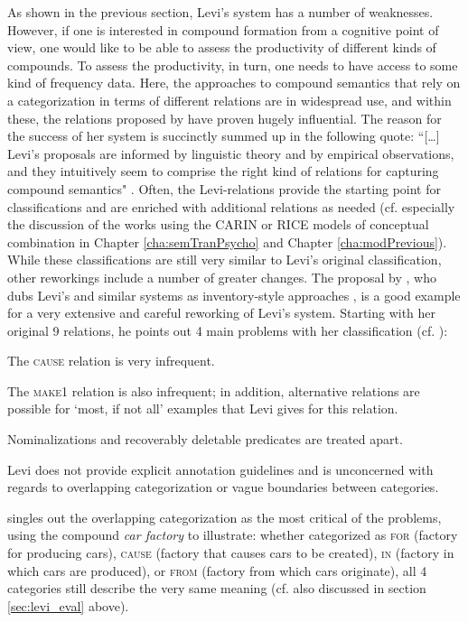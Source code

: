 As shown in the previous section, Levi's system has a
number of weaknesses. However, if one is interested in compound
formation from a cognitive point of view, one would like to be able to
assess the productivity of different kinds of compounds. To assess the
productivity, in turn, one needs to have access to some kind of
frequency data. Here, the approaches to compound semantics that rely
on a categorization in terms of different relations are in widespread
use, and within these, the relations proposed by \citet{Levi:1978}
have proven hugely influential. The reason for the success of her
system is succinctly summed up in the following quote: ``[\dots]
Levi’s proposals are informed by linguistic theory and by empirical
observations, and they intuitively seem to comprise the right kind of
relations for capturing compound semantics"
\citep[27]{Oseaghdha:2008}. Often, the Levi-relations provide the
starting point for classifications and are enriched with additional
relations as needed (cf. especially the discussion of the works using
the CARIN or RICE models of conceptual combination in Chapter
\ref{cha:semTranPsycho} and Chapter \ref{cha:modPrevious}). While these
classifications are still very similar to Levi's original
classification, other reworkings include a number of greater
changes. 
The proposal by \citet{Oseaghdha:2008}, who dubs Levi's and similar systems as
inventory-style approaches \citep[17]{Oseaghdha:2008}, is a good example for a very extensive and careful reworking of Levi's system.
Starting with her original 9 relations, he
points out 4 main problems with her classification
(cf. \citealt[30--31]{Oseaghdha:2008}): 
\begin{compactenum}%
\item The \textsc{cause} relation is very infrequent.
\item The \textsc{make1} relation is also infrequent; in addition, alternative
  relations are possible for `most, if not all' examples that Levi
  gives for this relation. 
\item Nominalizations and recoverably deletable predicates %
  are treated apart.
\item Levi does not provide explicit annotation guidelines and is
  unconcerned with regards to overlapping categorization or vague
  boundaries between categories.
\end{compactenum}
\citet[31]{Oseaghdha:2008} singles out the overlapping categorization
as the most critical of the problems, using the compound \emph{car factory} to
illustrate: whether categorized as \textsc{for} (factory for producing cars), \textsc{cause}
(factory that causes cars to be created), \textsc{in} (factory in which cars
are produced), or \textsc{from} (factory from which cars originate), all 4
categories still describe the very same meaning (cf. also
\citet{DevereuxandCostello:2005} discussed in section
\ref{sec:levi_eval} above).

